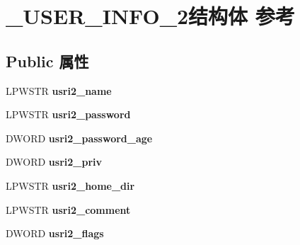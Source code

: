 \hypertarget{struct___u_s_e_r___i_n_f_o__2}{}\section{\+\_\+\+U\+S\+E\+R\+\_\+\+I\+N\+F\+O\+\_\+2结构体 参考}
\label{struct___u_s_e_r___i_n_f_o__2}
\subsection*{Public 属性}
\begin{DoxyCompactItemize}
\item 
\mbox{\label{struct___u_s_e_r___i_n_f_o__2_a8636e2be621a1ab31c3d69e736c22193}} 
L\+P\+W\+S\+TR {\bfseries usri2\+\_\+name}
\item 
\mbox{\label{struct___u_s_e_r___i_n_f_o__2_a944b52b7600cfc2b8ee4768c585d5c50}} 
L\+P\+W\+S\+TR {\bfseries usri2\+\_\+password}
\item 
\mbox{\label{struct___u_s_e_r___i_n_f_o__2_a6116df4d4979a5586baf1cf041f1bd1f}} 
D\+W\+O\+RD {\bfseries usri2\+\_\+password\+\_\+age}
\item 
\mbox{\label{struct___u_s_e_r___i_n_f_o__2_a31e6faaea7c495f3a0a859b383aecea4}} 
D\+W\+O\+RD {\bfseries usri2\+\_\+priv}
\item 
\mbox{\label{struct___u_s_e_r___i_n_f_o__2_ada89ec8a2f0012ecae1fdf31d2746c5f}} 
L\+P\+W\+S\+TR {\bfseries usri2\+\_\+home\+\_\+dir}
\item 
\mbox{\label{struct___u_s_e_r___i_n_f_o__2_ae7b617d93104999be1be1a2be262e839}} 
L\+P\+W\+S\+TR {\bfseries usri2\+\_\+comment}
\item 
\mbox{\label{struct___u_s_e_r___i_n_f_o__2_a593f5c5d5306d5f63d966ab2181ffbd1}} 
D\+W\+O\+RD {\bfseries usri2\+\_\+flags}
\item 
\mbox{\label{struct___u_s_e_r___i_n_f_o__2_ab5b71b6a1a7dc244969039cc3967d72c}} 

\end{DoxyCompactItemize}
